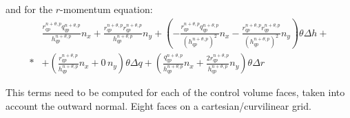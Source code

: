 and for the $r$-momentum equation:
\begin{align}
    &\frac{r^{n+\theta, p}_{qp}q^{n+\theta, p}_{qp}}{h^{n+\theta, p}_{qp}} n_x+
     \frac{r^{n+\theta, p}_{qp}r^{n+\theta, p}_{qp}}{h^{n+\theta, p}_{qp}} n_y
   + \left( -\frac{r^{n+\theta, p}_{qp}q^{n+\theta, p}_{qp}}{(h^{n+\theta, p}_{qp})^2} n_x -
\frac{r^{n+\theta, p}_{qp}r^{n+\theta, p}_{qp}}{(h^{n+\theta, p}_{qp})^2} n_y \right) \theta \Delta h +
\nonumber \\*
& +
\left( \frac{r^{n+\theta, p}_{qp}}{h^{n+\theta, p}_{qp}} n_x  + 0\, n_y \right) \theta \Delta q +
\left (
\frac{q^{n+\theta, p}_{qp}}{h^{n+\theta, p}_{qp}} n_x
+ \frac{2 r^{n+\theta, p}_{qp}}{h^{n+\theta, p}_{qp}} n_y \right) \theta \Delta r
\end{align}

This terms need to be computed for each of the control volume faces, taken into account the outward normal.
Eight faces on a cartesian/curvilinear grid.

